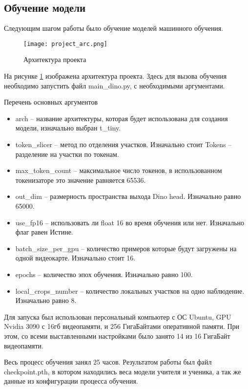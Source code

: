 \documentclass[../part_3.tex]{subfiles}
\begin{document}
\subsection{Обучение модели}
\par Следующим шагом работы было обучение моделей машинного обучения. 
\begin{figure}[H]
    \centering
    \texttt{[image: project\_arc.png]}
    \caption{Архитектура проекта}
    \label{fig:project_arc}
\end{figure}
\par На рисунке \ref{fig:project_arc} изображена архитектура проекта. Здесь для вызова обучения необходимо запустить файл main\_dino.py, с необходимыми аргументами.
\par Перечень основных аргументов
\begin{itemize}
    \item arch -- название архитектуры, которая будет использована для создания модели, изначально выбран t\_tiny.
    \item token\_slicer -- метод по отделения участков. Изначально стоит Tokens -- разделение на участки по токенам.
    \item max\_token\_count -- максимальное число токенов, в использованном токенизаторе это значение равняется 65536.
    \item out\_dim -- размерность пространства выхода Dino head. Изначально равно 65000.
    \item use\_fp16 -- использовать ли float 16 во время обучения или нет. Изначально флаг равен Истине.
    \item batch\_size\_per\_gpu -- количество примеров которые будут загружены на одной видеокарте. Изначально стоит 16.
    \item epochs -- количество эпох обучения. Изначально равно 100.
    \item local\_crops\_number -- количество локальных участков на одно наблюдение. Изначально равно 8.
\end{itemize}
\par Для запуска был использован персональный компьютер с ОС Ubuntu, GPU Nvidia 3090 с 16гб видеопамяти, и 256 ГигаБайтами оперативной памяти. При этом, со всеми выставленными настройками было занято 14 из 16 ГигаБайт видеопамяти.
\par Весь процесс обучения занял 25 часов. Результатом работы был файл checkpoint.pth, в котором находились веса модели учителя и ученика, а так же данные из конфигурации процесса обучения.
\end{document}
